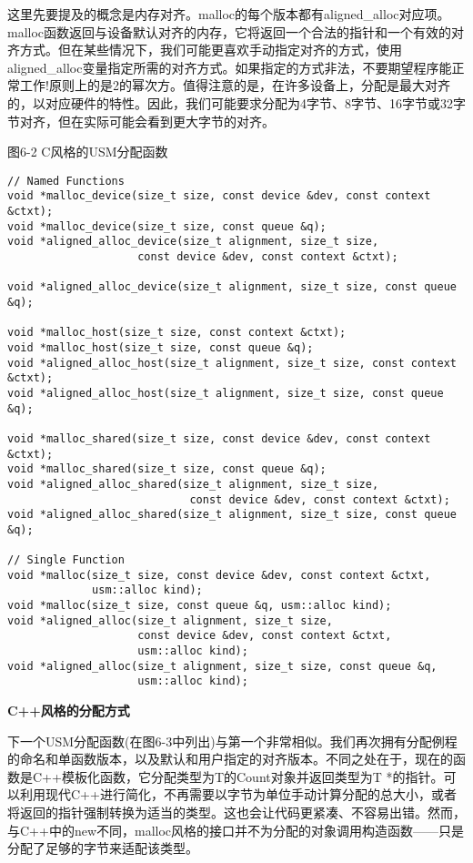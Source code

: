 这里先要提及的概念是内存对齐。malloc的每个版本都有aligned\_alloc对应项。malloc函数返回与设备默认对齐的内存，它将返回一个合法的指针和一个有效的对齐方式。但在某些情况下，我们可能更喜欢手动指定对齐的方式，使用aligned\_alloc变量指定所需的对齐方式。如果指定的方式非法，不要期望程序能正常工作!原则上的是2的幂次方。值得注意的是，在许多设备上，分配是最大对齐的，以对应硬件的特性。因此，我们可能要求分配为4字节、8字节、16字节或32字节对齐，但在实际可能会看到更大字节的对齐。\par

\hspace*{\fill} \par %
图6-2 C风格的USM分配函数
\begin{lstlisting}[caption={}]
// Named Functions
void *malloc_device(size_t size, const device &dev, const context &ctxt);
void *malloc_device(size_t size, const queue &q);
void *aligned_alloc_device(size_t alignment, size_t size,
					const device &dev, const context &ctxt);

void *aligned_alloc_device(size_t alignment, size_t size, const queue &q);

void *malloc_host(size_t size, const context &ctxt);
void *malloc_host(size_t size, const queue &q);
void *aligned_alloc_host(size_t alignment, size_t size, const context
&ctxt);
void *aligned_alloc_host(size_t alignment, size_t size, const queue &q);

void *malloc_shared(size_t size, const device &dev, const context &ctxt);
void *malloc_shared(size_t size, const queue &q);
void *aligned_alloc_shared(size_t alignment, size_t size,
							const device &dev, const context &ctxt);
void *aligned_alloc_shared(size_t alignment, size_t size, const queue &q);

// Single Function
void *malloc(size_t size, const device &dev, const context &ctxt,
			 usm::alloc kind);
void *malloc(size_t size, const queue &q, usm::alloc kind);
void *aligned_alloc(size_t alignment, size_t size,
					const device &dev, const context &ctxt,
					usm::alloc kind);
void *aligned_alloc(size_t alignment, size_t size, const queue &q,
					usm::alloc kind);
\end{lstlisting}

\hspace*{\fill} \par %
\textbf{C++风格的分配方式}

下一个USM分配函数(在图6-3中列出)与第一个非常相似。我们再次拥有分配例程的命名和单函数版本，以及默认和用户指定的对齐版本。不同之处在于，现在的函数是C++模板化函数，它分配类型为T的Count对象并返回类型为T *的指针。可以利用现代C++进行简化，不再需要以字节为单位手动计算分配的总大小，或者将返回的指针强制转换为适当的类型。这也会让代码更紧凑、不容易出错。然而，与C++中的new不同，malloc风格的接口并不为分配的对象调用构造函数——只是分配了足够的字节来适配该类型。\par

